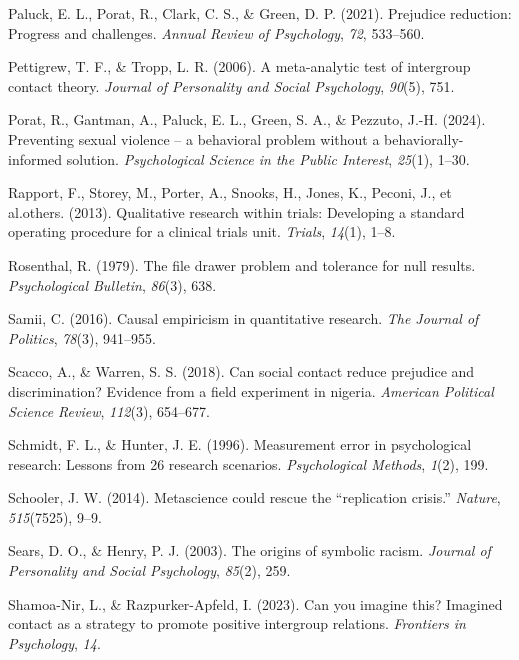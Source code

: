 \documentclass[
  ,jou]{apa6}
\newlength{\cslhangindent}
\newenvironment{CSLReferences}[2] %
 {\begin{list}{}{%
  \setlength{\itemindent}{0pt}
  \setlength{\leftmargin}{0pt}
  \setlength{\parsep}{0pt}
  \ifodd #1
   \setlength{\leftmargin}{\cslhangindent}
   \setlength{\itemindent}{-1\cslhangindent}
  \fi
  \setlength{\itemsep}{#2\baselineskip}}}
 {\end{list}}
\begin{document}
\begin{CSLReferences}{1}{0}
Paluck, E. L., Porat, R., Clark, C. S., \& Green, D. P. (2021). Prejudice reduction: Progress and challenges. \emph{Annual Review of Psychology}, \emph{72}, 533--560.

Pettigrew, T. F., \& Tropp, L. R. (2006). A meta-analytic test of intergroup contact theory. \emph{Journal of Personality and Social Psychology}, \emph{90}(5), 751.

Porat, R., Gantman, A., Paluck, E. L., Green, S. A., \& Pezzuto, J.-H. (2024). Preventing sexual violence -- a behavioral problem without a behaviorally-informed solution. \emph{Psychological Science in the Public Interest}, \emph{25}(1), 1--30.

Rapport, F., Storey, M., Porter, A., Snooks, H., Jones, K., Peconi, J., et al.others. (2013). Qualitative research within trials: Developing a standard operating procedure for a clinical trials unit. \emph{Trials}, \emph{14}(1), 1--8.

Rosenthal, R. (1979). The file drawer problem and tolerance for null results. \emph{Psychological Bulletin}, \emph{86}(3), 638.

Samii, C. (2016). Causal empiricism in quantitative research. \emph{The Journal of Politics}, \emph{78}(3), 941--955.

Scacco, A., \& Warren, S. S. (2018). Can social contact reduce prejudice and discrimination? Evidence from a field experiment in nigeria. \emph{American Political Science Review}, \emph{112}(3), 654--677.

Schmidt, F. L., \& Hunter, J. E. (1996). Measurement error in psychological research: Lessons from 26 research scenarios. \emph{Psychological Methods}, \emph{1}(2), 199.

Schooler, J. W. (2014). Metascience could rescue the {``replication crisis.''} \emph{Nature}, \emph{515}(7525), 9--9.

Sears, D. O., \& Henry, P. J. (2003). The origins of symbolic racism. \emph{Journal of Personality and Social Psychology}, \emph{85}(2), 259.

Shamoa-Nir, L., \& Razpurker-Apfeld, I. (2023). Can you imagine this? Imagined contact as a strategy to promote positive intergroup relations. \emph{Frontiers in Psychology}, \emph{14}.


\end{CSLReferences}
\end{document}
